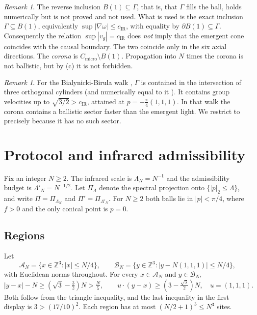 \documentclass[11pt]{amsart}
\theoremstyle{definition}
\theoremstyle{remark}
\newtheorem{remark}[theorem]{Remark}
\newcommand{\Z}{\mathbb{Z}}
\newcommand{\cA}{\mathcal{A}}
\newcommand{\cB}{\mathcal{B}}
\newcommand{\Cmicro}{C_{\mathrm{micro}}}
\newcommand{\cIR}{c_{\mathrm{IR}}}
\begin{document}
\begin{remark}
The reverse inclusion $B(1)\subseteq\Gamma$, that is, that $\Gamma$ fills
the ball, holds numerically but is not proved and not used.  What is used is
the exact inclusion $\Gamma\subseteq B(1)$, equivalently
$\sup|\nabla\omega|\le\cIR$, with equality by $\partial B(1)\subseteq\Gamma$.  Consequently the relation
$\sup|v_g|=\cIR$ does \emph{not} imply that the emergent cone coincides with
the causal boundary.  The two coincide only in the six axial directions.
The \emph{corona} is $\Cmicro\setminus B(1)$.  Propagation into $N$ times
the corona is not ballistic, but by (c) it is not forbidden.
\end{remark}

\begin{remark}
For the Bialynicki-Birula walk \cite[Eq.~(5.12)]{CJWW}, $\Gamma$ is contained
in the intersection of three orthogonal cylinders (and numerically equal to
it \cite[Fig.~5]{CJWW}).  It contains group velocities up to
$\sqrt{3/2}>\cIR$, attained at $p=-\frac\pi4(1,1,1)$.  In that walk the corona contains a ballistic sector
faster than the emergent light.  We restrict to \cite[Eq.~(5.15)]{CJWW}
precisely because it has no such sector.
\end{remark}

\section{Protocol and infrared admissibility}\label{sec:protocol}

Fix an integer $N\ge2$.  The infrared scale is $\Lambda_N=N^{-1}$ and the
admissibility budget is $\Lambda'_N=N^{-1/2}$.  Let $\Pi_\Lambda$ denote the
spectral projection onto $\{|p|_2\le\Lambda\}$, and write $\Pi=\Pi_{\Lambda_N}$
and $\Pi'=\Pi_{\Lambda'_N}$.  For $N\ge2$ both balls lie in $|p|<\pi/4$,
where $f>0$ and the only conical point is $p=0$.

\subsection{Regions}
Let
\[
\cA_N=\{x\in\Z^3:|x|\le N/4\},\qquad \cB_N=\{y\in\Z^3:|y-N(1,1,1)|\le N/4\},
\]
with Euclidean norms throughout.  For every $x\in\cA_N$ and $y\in\cB_N$,
\begin{equation}\label{eq:separation}
|y-x|-N\ge(\sqrt3-\tfrac32)N>\tfrac N5,
\qquad
u\cdot(y-x)\ge(3-\tfrac{\sqrt3}2)N,\quad u=(1,1,1).
\end{equation}
Both follow from the triangle inequality, and the last inequality in the
first display is $3>(17/10)^2$.  Each region has at most $(N/2+1)^3\le N^3$
sites.
\end{document}
